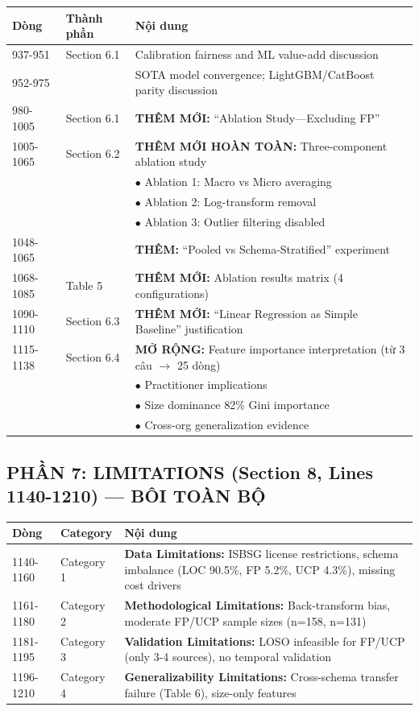 \documentclass[11pt,a4paper]{article}
\begin{document}
\begin{longtable}{p{}p{}p{}}
\toprule
\textbf{Dòng} & \textbf{Thành phần} & \textbf{Nội dung} \\
\midrule
937-951 & Section 6.1 & Calibration fairness and ML value-add discussion \\
952-975 & & SOTA model convergence; LightGBM/CatBoost parity discussion \\
980-1005 & Section 6.1 & \textbf{THÊM MỚI:} ``Ablation Study---Excluding FP'' \\
1005-1065 & Section 6.2 & \textbf{THÊM MỚI HOÀN TOÀN:} Three-component ablation study \\
& & $\bullet$ Ablation 1: Macro vs Micro averaging \\
& & $\bullet$ Ablation 2: Log-transform removal \\
& & $\bullet$ Ablation 3: Outlier filtering disabled \\
1048-1065 & & \textbf{THÊM:} ``Pooled vs Schema-Stratified'' experiment \\
1068-1085 & Table 5 & \textbf{THÊM MỚI:} Ablation results matrix (4 configurations) \\
1090-1110 & Section 6.3 & \textbf{THÊM MỚI:} ``Linear Regression as Simple Baseline'' justification \\
1115-1138 & Section 6.4 & \textbf{MỞ RỘNG:} Feature importance interpretation (từ 3 câu $\rightarrow$ 25 dòng) \\
& & $\bullet$ Practitioner implications \\
& & $\bullet$ Size dominance 82\% Gini importance \\
& & $\bullet$ Cross-org generalization evidence \\
\bottomrule
\end{longtable}

\newpage

\subsection*{PHẦN 7: LIMITATIONS (Section 8, Lines 1140-1210) --- BÔI TOÀN BỘ}

\begin{longtable}{p{}p{}p{}}
\toprule
\textbf{Dòng} & \textbf{Category} & \textbf{Nội dung} \\
\midrule
1140-1160 & Category 1 & \textbf{Data Limitations:} ISBSG license restrictions, schema imbalance (LOC 90.5\%, FP 5.2\%, UCP 4.3\%), missing cost drivers \\
1161-1180 & Category 2 & \textbf{Methodological Limitations:} Back-transform bias, moderate FP/UCP sample sizes (n=158, n=131) \\
1181-1195 & Category 3 & \textbf{Validation Limitations:} LOSO infeasible for FP/UCP (only 3-4 sources), no temporal validation \\
1196-1210 & Category 4 & \textbf{Generalizability Limitations:} Cross-schema transfer failure (Table 6), size-only features \\
\bottomrule
\end{longtable}
\end{document}
